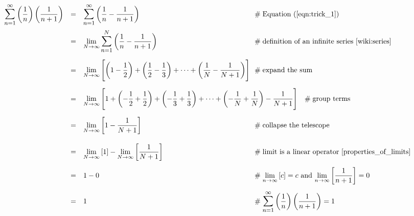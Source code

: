 \documentclass{article}
\theoremstyle{definition}
\begin{document}
\medskip
\begin{equation*}
\begin{array}{lllll}
{\displaystyle \mathlarger{\sum\limits_{n=1}^\infty} \left ( \frac{1}{n} \right ) \left ( \frac{1}{n+1} \right )}
&=& {\displaystyle \mathlarger{\sum\limits_{n=1}^\infty} \left ( \frac{1}{n} - \frac{1}{n+1} \right )}
                &\hspace{-7em} \mathrel{\#} \text{Equation (\ref{eqn:trick_1})} \\
[15pt]
&=& {\displaystyle \lim_{N \to \infty}\mathlarger{ \sum_{n=1}^N}
\left( \frac{1}{n} - \frac{1}{n+1} \right)}
                &\hspace{-7em} \mathrel{\#} \text{definition of an infinite series \cite{wiki:series}} \\
[19pt]
&=& {\displaystyle \lim_{N \to \infty} \left\lbrack {\left(1 -
        \frac{1}{2}\right) + \left(\frac{1}{2} - \frac{1}{3}\right) +
        \cdots + \left(\frac{1}{N} - \frac{1}{N+1}\right) } \right\rbrack}
				&\hspace{-7em} \mathrel{\#} \text{expand the sum} \\
[19pt]
&=& {\displaystyle \lim_{N \to \infty} \left\lbrack {  1 + \left(
        - \frac{1}{2} + \frac{1}{2}\right) + \left( - \frac{1}{3} +
        \frac{1}{3}\right) + \cdots + \left( - \frac{1}{N} +
        \frac{1}{N}\right) - \frac{1}{N+1} } \right\rbrack}
				& \mathrel{\#} \text{group terms} \\
[19pt]
&=& {\displaystyle \lim_{N \to \infty} \left\lbrack {  1  -
\frac{1}{N+1} } \right\rbrack}
                &\hspace{-7em} \mathrel{\#} \text{collapse the telescope} \\
[19pt]
&=& {\displaystyle \lim_{N \to \infty} \left [ 1 \right ] - \lim_{N \to \infty} \left [ \frac{1}{N+1} \right ]}
                &\hspace{-7em} \mathrel{\#} \text{limit is a linear 
                	operator \cite{properties_of_limits}} \\
[15pt]
&=& 1 - 0
                &\hspace{-7em} \mathrel{\#} {\displaystyle \lim_{n \to \infty} \left [ c \right ] = c} \text{ and }
                {\displaystyle \lim_{n \to \infty} \left [ \dfrac{1}{n+1} \right ] = 0} \\
[15pt]
&=& 1			&\hspace{-7em} \mathrel{\#} {\displaystyle \mathlarger{\sum\limits_{n=1}^\infty} 
					\left ( \frac{1}{n} \right ) \left ( \frac{1}{n+1} \right ) = 1}
         
\end{array}
\end{equation*}
\end{document}
